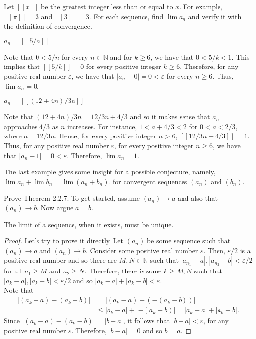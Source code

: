 \documentclass[12pt]{article}
\newcommand{\N}{\mathbb{N}}
\newenvironment{problem}[2][Problem]{\begin{trivlist} \item[\hskip \labelsep {\bfseries #1}\hskip \labelsep {\bfseries #2.}]}{\end{trivlist}}
\newenvironment{solution}[1][Solution]{\begin{trivlist} \item[\hskip \labelsep {\bfseries #1}]}{\end{trivlist}}
\begin{document}
    \begin{problem}{2.2.5}
      Let $\left[ \left[ x \right] \right]$ be the greatest integer less than or equal to $x$. For example, $\left[ \left[ \pi \right] \right]=3$ and $\left[ \left[ 3 \right] \right]=3$. For each sequence, find $\lim a_{n}$ and verify it with the definition of convergence.
      \begin{enumerate}[label=(\alph*)]
      \item $a_{n}=\left[ \left[ 5/n \right] \right]$
    \begin{solution}
      Note that $0<5/n$ for every $n\in\N$ and for $k\geq 6$, we have that $0<5/k<1$. This implies that $\left[ \left[ 5/k \right]\right]=0$ for every positive integer $k\geq 6$. Therefore, for any positive real number $\varepsilon$, we have that $|a_{n}-0| = 0 < \varepsilon$ for every $n\geq 6$. Thus, $\lim a_{n}=0$.
    \end{solution}
      \item $a_{n} = \left[ \left[ \left( 12+4n \right)/3n \right] \right]$
    \begin{solution}
      Note that $\left( 12+4n \right)/3n = 12/3n + 4/3$ and so it makes sense that $a_{n}$ approaches $4/3$ as $n$ increases. For instance, $1<a + 4/3<2$ for $0<a < 2/3$, where $a=12/3n$. Hence, for every positive integer $n>6$, $[[12/3n+4/3]] = 1$. Thus, for any positive real number $\varepsilon$, for every positive integer $n\geq 6$, we have that $|a_{n} - 1| = 0 < \varepsilon$. Therefore, $\lim a_{n} = 1$.    
    \end{solution}
    \end{enumerate}
    The last example gives some insight for a possible conjecture, namely, $\lim a_{n} + \lim b_{n} = \lim(a_{n}+b_{n})$, for convergent sequences $(a_{n})$ and $(b_{n})$.
    \end{problem}
    \begin{problem}{2.2.6}
      Prove Theorem 2.2.7. To get started, assume $(a_{n})\to a$ and also that $(a_{n})\to b$. Now argue $a=b$.
    \begin{solution}
      The limit of a sequence, when it exists, must be unique.
    \begin{proof} 
      Let's try to prove it directly. Let $(a_{n})$ be some sequence such that $(a_{n})\to a$ and $(a_{n})\to b$. Consider some positive real number $\varepsilon$. Then, $\varepsilon/2$ is a positive real number and so there are $M,N\in \N$ such that $|a_{n_{1}}-a|,|a_{n_{2}}-b| < \varepsilon/2$ for all $n_{1}\geq M$ and $n_{2}\geq N$. Therefore, there is some $k\geq M,N$ such that $|a_{k}-a|,|a_{k}-b|< \varepsilon/2$ and so $|a_{k}-a|+|a_{k}-b| < \varepsilon$. \\
      Note that
    \begin{align*}
      |(a_{k}-a)-(a_{k}-b)| &= |(a_{k}-a)+(-(a_{k}-b))|\\
      &\leq |a_{k}-a|+|-(a_{k}-b)| = |a_{k}-a|+|a_{k}-b|.
    \end{align*}
    Since $|(a_{k}-a)-(a_{k}-b)| = |b-a|$, it follows that $|b-a|<\varepsilon$, for any positive real number $\varepsilon$. Therefore, $|b-a|=0$ and so $b=a$. 
    \end{proof}
    \end{solution}
    \end{problem}
\end{document}
